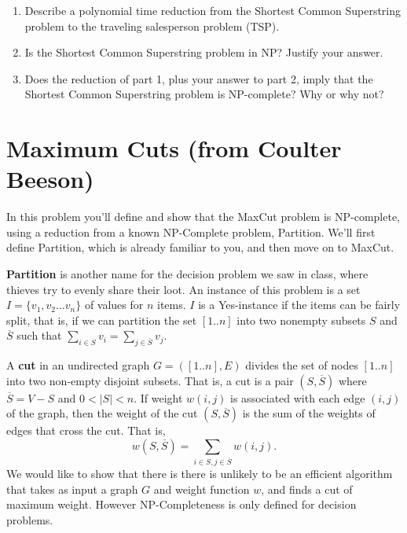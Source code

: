 \documentclass[11pt]{article}
\def\question#1{\red{#1}}
\def\red#1{{\color{red}#1}}
\begin{document}
\begin{enumerate}
\item \question{Describe a polynomial time reduction from the Shortest Common
Superstring problem to the traveling salesperson problem (TSP).}

\item \question{Is the Shortest Common Superstring problem in NP? Justify your answer.}

\item \question{Does the reduction of part 1, plus your answer to part 2, imply
that the Shortest Common Superstring problem is NP-complete?  Why
or why not?}
\end{enumerate}

\section{Maximum Cuts (from Coulter Beeson)}
\label{sec-4}
In this problem you'll define and show that the MaxCut problem is
NP-complete, using a reduction from a known NP-Complete problem,
Partition.  We'll first define Partition, which is already familiar to you, 
and then move on to MaxCut.

\textbf{Partition} is another name for the decision problem we saw in class,
where thieves try to evenly share their loot. An instance of this
problem is a set $I = \{v_1, v_2 ... v_n\}$ of values for $n$ items.
$I$ is a Yes-instance if the items can be fairly split, that is, if we
can partition the set $[1..n]$ into two nonempty subsets $S$ and
$\overline{S}$ such that $\sum_{i\in S}v_i = \sum_{j \in \overline{S}}
v_j$.

A \textbf{cut} in an undirected graph $G=([1..n],E)$ divides the set of nodes $[1..n]$ into
two non-empty disjoint subsets. That is, a cut is a pair $(S,
\overline{S})$ where $\overline{S} = V-S$
and $0 < |S| < n$. If weight $w(i,j)$ is associated with each edge $(i,j)$ of the graph,
then the weight of the cut $(S,\overline{S})$ is the sum of
the weights of edges that cross the cut. That is,
\[
w(S,\overline{S}) = \sum_{i \in S, j \in \overline{S}} w(i,j).
\]
We would like to show that there is there is unlikely to be an
efficient algorithm that takes as input a graph $G$ and weight
function $w$, and finds a cut of maximum weight. However
NP-Completeness is only defined for decision problems.
\end{document}
